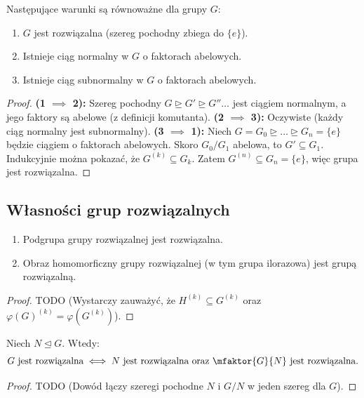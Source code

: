 \begin{theorem}
	Następujące warunki są równoważne dla grupy $G$:
	\begin{enumerate}[label=\arabic*)]
		\item $G$ jest rozwiązalna (szereg pochodny zbiega do $\{e\}$).
		\item Istnieje ciąg normalny w $G$ o faktorach abelowych.
		\item Istnieje ciąg subnormalny w $G$ o faktorach abelowych.
	\end{enumerate}
\end{theorem} 
\begin{proof}
	\textbf{(1 $\implies$ 2):} Szereg pochodny $G \unrhd G' \unrhd G'' \dots$ jest ciągiem normalnym, a jego faktory są abelowe (z definicji komutanta).
	\textbf{(2 $\implies$ 3):} Oczywiste (każdy ciąg normalny jest subnormalny).
	\textbf{(3 $\implies$ 1):} Niech $G = G_0 \unrhd \dots \unrhd G_n = \{e\}$ będzie ciągiem o faktorach abelowych. Skoro $G_0/G_1$ abelowa, to $G' \subseteq G_1$. Indukcyjnie można pokazać, że $G^{(k)} \subseteq G_k$. Zatem $G^{(n)} \subseteq G_n = \{e\}$, więc grupa jest rozwiązalna.
\end{proof} 

\subsection{Własności grup rozwiązalnych}

\begin{lemma}
	\begin{enumerate}[label=\alph*)]
		\item Podgrupa grupy rozwiązalnej jest rozwiązalna.
		\item Obraz homomorficzny grupy rozwiązalnej (w tym grupa ilorazowa) jest grupą rozwiązalną.
	\end{enumerate}
\end{lemma} 
\begin{proof}
	TODO (Wystarczy zauważyć, że $H^{(k)} \subseteq G^{(k)}$ oraz $\varphi(G)^{(k)} = \varphi(G^{(k)})$).
\end{proof} 

\begin{theorem}[O rozszerzeniach]
	Niech $N \unlhd G$. Wtedy:
	\[ G \text{ jest rozwiązalna} \iff N \text{ jest rozwiązalna oraz } \mfaktor{G}{N} \text{ jest rozwiązalna}. \]
\end{theorem} 
\begin{proof}
	TODO (Dowód łączy szeregi pochodne $N$ i $G/N$ w jeden szereg dla $G$).
\end{proof} 

